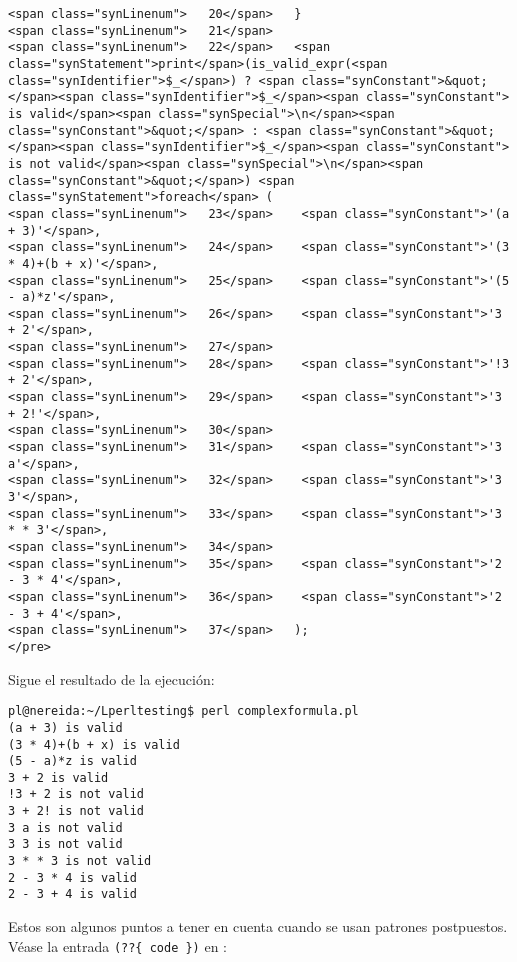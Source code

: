 \begin{verbatim}
<span class="synLinenum">   20</span>   }
<span class="synLinenum">   21</span> 
<span class="synLinenum">   22</span>   <span class="synStatement">print</span>(is_valid_expr(<span class="synIdentifier">$_</span>) ? <span class="synConstant">&quot;</span><span class="synIdentifier">$_</span><span class="synConstant"> is valid</span><span class="synSpecial">\n</span><span class="synConstant">&quot;</span> : <span class="synConstant">&quot;</span><span class="synIdentifier">$_</span><span class="synConstant"> is not valid</span><span class="synSpecial">\n</span><span class="synConstant">&quot;</span>) <span class="synStatement">foreach</span> (
<span class="synLinenum">   23</span>    <span class="synConstant">'(a + 3)'</span>,
<span class="synLinenum">   24</span>    <span class="synConstant">'(3 * 4)+(b + x)'</span>,
<span class="synLinenum">   25</span>    <span class="synConstant">'(5 - a)*z'</span>,
<span class="synLinenum">   26</span>    <span class="synConstant">'3 + 2'</span>,
<span class="synLinenum">   27</span> 
<span class="synLinenum">   28</span>    <span class="synConstant">'!3 + 2'</span>,
<span class="synLinenum">   29</span>    <span class="synConstant">'3 + 2!'</span>,
<span class="synLinenum">   30</span> 
<span class="synLinenum">   31</span>    <span class="synConstant">'3 a'</span>,
<span class="synLinenum">   32</span>    <span class="synConstant">'3 3'</span>,
<span class="synLinenum">   33</span>    <span class="synConstant">'3 * * 3'</span>,
<span class="synLinenum">   34</span> 
<span class="synLinenum">   35</span>    <span class="synConstant">'2 - 3 * 4'</span>,
<span class="synLinenum">   36</span>    <span class="synConstant">'2 - 3 + 4'</span>,
<span class="synLinenum">   37</span>   );
</pre>

\end{verbatim}

Sigue el resultado de la ejecución:
\begin{verbatim}
pl@nereida:~/Lperltesting$ perl complexformula.pl
(a + 3) is valid
(3 * 4)+(b + x) is valid
(5 - a)*z is valid
3 + 2 is valid
!3 + 2 is not valid
3 + 2! is not valid
3 a is not valid
3 3 is not valid
3 * * 3 is not valid
2 - 3 * 4 is valid
2 - 3 + 4 is valid
\end{verbatim}


Estos son algunos puntos a tener en cuenta cuando se usan patrones postpuestos.
Véase la entrada \verb|(??{ code })| en :

